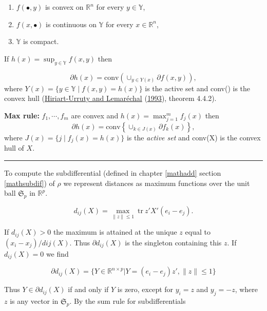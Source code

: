 \documentclass[
  12pt,
]{book}
\providecommand{\tightlist}{%
  \setlength{\itemsep}{0pt}\setlength{\parskip}{0pt}}
\theoremstyle{definition}
\theoremstyle{definition}
\theoremstyle{definition}
\theoremstyle{definition}
\theoremstyle{remark}
\begin{document}
\begin{enumerate}
\def\labelenumi{\arabic{enumi}.}
\tightlist
\item
  \(f(\bullet,y)\) is convex on \(\mathbb{R}^n\) for every \(y\in \mathbb{Y}\),
\item
  \(f(x,\bullet)\) is continuous on \(\mathbb{Y}\) for every \(x\in\mathbb{R}^n\),
\item
  \(\mathbb{Y}\) is compact.
\end{enumerate}

If \(h(x)=\sup_{y\in\mathbb{Y}}f(x,y)\) then

\[
\partial h(x)=\text{conv}\left(\mathop{\cup}_{y\in Y(x)}\partial f(x,y)\right),
\]
where \(Y(x)=\{y\in\mathbb{Y}\mid f(x,y)=h(x)\}\) is the active set and conv() is the convex hull (\protect\hyperlink{ref-hiriart-urruty_lemarechal_93a}{Hiriart-Urruty and Lemaréchal} (\protect\hyperlink{ref-hiriart-urruty_lemarechal_93a}{1993}), theorem 4.4.2).

\textbf{Max rule:} \(f_1,\cdots,f_m\) are convex and \(h(x)=\max_{j=1}^m f_j(x)\) then
\[
\partial h(x)=\text{conv}\left\{\mathop{\cup}_{k\in J(x)}\partial f_k(x)\right\},
\]
where \(J(x)=\{j\mid f_j(x)=h(x)\}\) is the \emph{active set} and conv(X) is the convex hull of \(X\).

\begin{center}\rule{0.5\linewidth}{0.5pt}\end{center}

To compute the subdifferential (defined in chapter \ref{mathadd} section \ref{mathsubdif}) of \(\rho\) we represent distances as maximum functions over the unit ball \(\mathfrak{S}_p\) in \(\mathbb{R}^p\).

\begin{equation}
d_{ij}(X)=\max_{\|z\|\leq 1}\ \text{tr}\ z'X'(e_i-e_j).
\label{eq:propdistmax}
\end{equation}

If \(d_{ij}(X)>0\) the maximum is attained at the unique \(z\) equal to \((x_i-x_j)/d{ij}(X)\). Thus \(\partial d_{ij}(X)\) is the singleton containing this \(z\). If \(d_{ij}(X)=0\) we find

\begin{equation}
\partial d_{ij}(X)=\{Y\in\mathbb{R}^{n\times p}|Y=(e_i-e_j)z', \|z\|\leq 1\}
\label{eq:propsubdiff0}
\end{equation}

Thus \(Y\in\partial d_{ij}(X)\) if and only if \(Y\) is zero, except for \(y_i=z\) and \(y_j=-z\), where \(z\) is
any vector in \(\mathfrak{S}_p\). By the sum rule for subdifferentials
\end{document}
